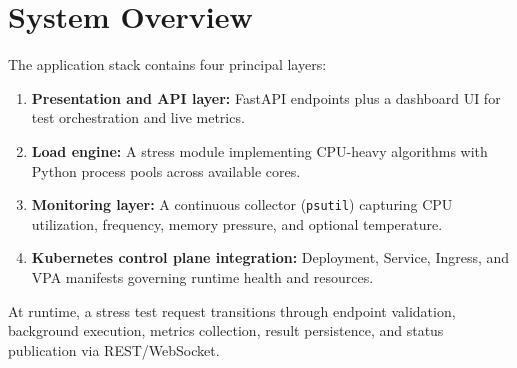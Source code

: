 \documentclass[11pt,a4paper]{article}
\begin{document}
\section{System Overview}
The application stack contains four principal layers:

\begin{enumerate}[leftmargin=1.5em]
	\item \textbf{Presentation and API layer:} FastAPI endpoints plus a dashboard UI for test orchestration and live metrics.
	\item \textbf{Load engine:} A stress module implementing CPU-heavy algorithms with Python process pools across available cores.
	\item \textbf{Monitoring layer:} A continuous collector (\texttt{psutil}) capturing CPU utilization, frequency, memory pressure, and optional temperature.
	\item \textbf{Kubernetes control plane integration:} Deployment, Service, Ingress, and VPA manifests governing runtime health and resources.
\end{enumerate}

At runtime, a stress test request transitions through endpoint validation, background execution, metrics collection, result persistence, and status publication via REST/WebSocket.
\end{document}
